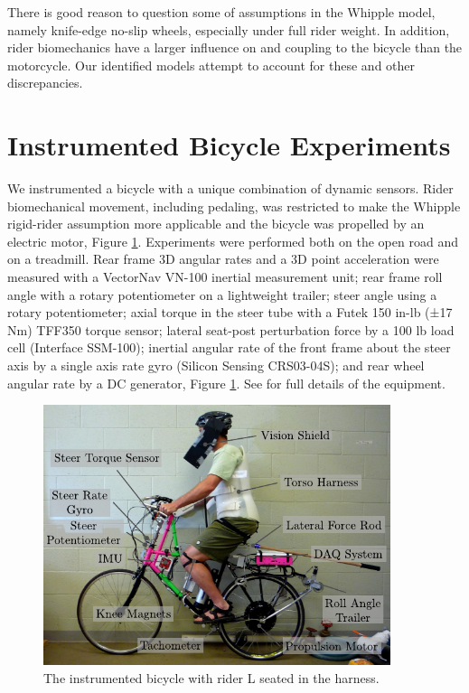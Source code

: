 \documentclass[a4paper]{article}
\begin{document}
There is good reason to question some of assumptions in the Whipple model,
namely knife-edge no-slip wheels, especially under full rider weight. In
addition, rider biomechanics have a larger influence on and coupling to the
bicycle than the motorcycle. Our identified models attempt to account for these
and other discrepancies.

\section*{Instrumented Bicycle Experiments}

We instrumented a bicycle with a unique combination of dynamic sensors. Rider
biomechanical movement, including pedaling, was restricted to make the Whipple
rigid-rider assumption more applicable and the bicycle was propelled by an
electric motor, Figure \ref{fig:instrumented-bicycle}. Experiments were
performed both on the open road and on a treadmill. Rear frame 3D angular rates
and a 3D point acceleration were measured with a VectorNav VN-100 inertial
measurement unit; rear frame roll angle with a rotary potentiometer on a
lightweight trailer; steer angle using a rotary potentiometer; axial torque in
the steer tube with a Futek 150 in-lb (±17 Nm) TFF350 torque sensor; lateral
seat-post perturbation force by a 100 lb load cell (Interface SSM-100);
inertial angular rate of the front frame about the steer axis by a single axis
rate gyro (Silicon Sensing CRS03-04S); and rear wheel angular rate by a DC
generator, Figure \ref{fig:instrumented-bicycle}. See \cite{Moore2012} for full
details of the equipment.

\begin{figure}
  \label{fig:instrumented-bicycle}
  \centering
  \includegraphics[width=4in]{figures/instrumented-bicycle.pdf}
  \caption{The instrumented bicycle with rider L seated in the harness.}
\end{figure}
\end{document}
